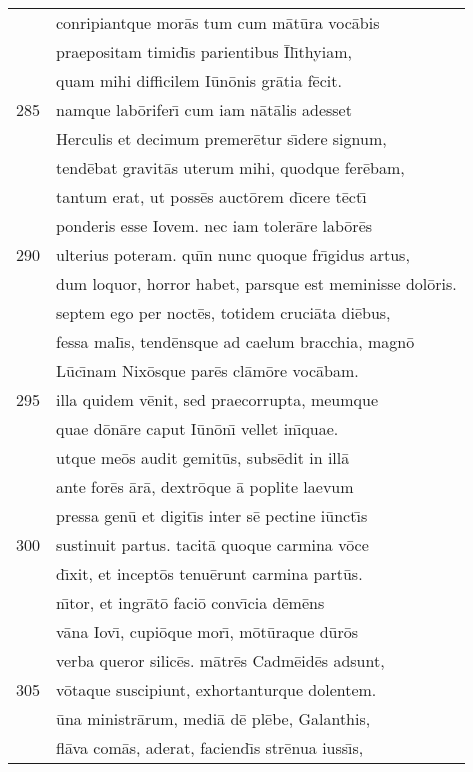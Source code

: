 \documentclass[paper=6in:9in,pagesize=pdftex,
               headinclude=on,footinclude=on,12pt]{scrbook}
\begin{document}
\begin{longtable}[p]{ r l }
 & conripiantque mor\=as tum cum m\=at\=ura voc\=abis\\ 
 & praepositam timid\={\i}s parientibus \=Il\={\i}thyiam,\\ 
 & quam mihi difficilem I\=un\=onis gr\=atia f\=ecit.\\ 
285 & namque lab\=orifer\={\i} cum iam n\=at\=alis adesset\\ 
 & Herculis et decimum premer\=etur s\={\i}dere signum,\\ 
 & tend\=ebat gravit\=as uterum mihi, quodque fer\=ebam,\\ 
 & tantum erat, ut poss\=es auct\=orem d\={\i}cere t\=ect\={\i}\\ 
 & ponderis esse Iovem. nec iam toler\=are lab\=or\=es\\ 
290 & ulterius poteram. qu\={\i}n nunc quoque fr\={\i}gidus artus,\\ 
 & dum loquor, horror habet, parsque est meminisse dol\=oris.\\ 
 & septem ego per noct\=es, totidem cruci\=ata di\=ebus,\\ 
 & fessa mal\={\i}s, tend\=ensque ad caelum bracchia, magn\=o\\ 
 & L\=uc\={\i}nam Nix\=osque par\=es cl\=am\=ore voc\=abam.\\ 
295 & illa quidem v\=enit, sed praecorrupta, meumque\\ 
 & quae d\=on\=are caput I\=un\=on\={\i} vellet in\={\i}quae.\\ 
 & utque me\=os audit gemit\=us, subs\=edit in ill\=a\\ 
 & ante for\=es \=ar\=a, dextr\=oque \=a poplite laevum\\ 
 & pressa gen\=u et digit\={\i}s inter s\=e pectine i\=unct\={\i}s\\ 
300 & sustinuit partus. tacit\=a quoque carmina v\=oce\\ 
 & d\={\i}xit, et incept\=os tenu\=erunt carmina part\=us.\\ 
 & n\={\i}tor, et ingr\=at\=o faci\=o conv\={\i}cia d\=em\=ens\\ 
 & v\=ana Iov\={\i}, cupi\=oque mor\={\i}, m\=ot\=uraque d\=ur\=os\\ 
 & verba queror silic\=es. m\=atr\=es Cadm\=eid\=es adsunt,\\ 
305 & v\=otaque suscipiunt, exhortanturque dolentem.\\ 
 & \=una ministr\=arum, medi\=a d\=e pl\=ebe, Galanthis,\\ 
 & fl\=ava com\=as, aderat, faciend\={\i}s str\=enua iuss\={\i}s,\\ 

\end{longtable}
\end{document}

